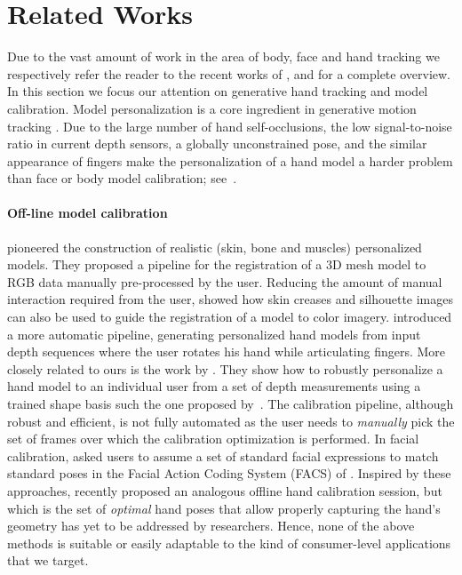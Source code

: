 \section{Related Works}
Due to the vast amount of work in the area of body, face and hand tracking we respectively refer the reader to the recent works of ,  and  for a complete overview. In this section we focus our attention on generative hand tracking and model calibration. Model personalization is a core ingredient in generative motion tracking \cite{pons2011model}.  Due to the large number of hand self-occlusions, the low signal-to-noise ratio in current depth sensors, a globally unconstrained pose, and the similar appearance of fingers make the personalization of a hand model a harder problem than face or body model calibration; see~\cite{supancic2015depth}.

\paragraph{Off-line model calibration}
 pioneered the construction of realistic (skin, bone and muscles) personalized models. They proposed a pipeline for the registration of a 3D mesh model to RGB data manually pre-processed by the user. Reducing the amount of manual interaction required from the user,  showed how skin creases and silhouette images can also be used to guide the registration of a model to color imagery.  introduced a more automatic pipeline, generating personalized hand models from input depth sequences where the user rotates his hand while articulating fingers. More closely related to ours is the work by . They show how to robustly personalize a hand model to an individual user from a set of depth measurements using a trained shape basis such the one proposed by~. The calibration pipeline, although robust and efficient, is not fully automated as the user needs to \emph{manually} pick the set of frames over which the calibration optimization is performed. 
In facial calibration,  asked users to assume a set of standard facial expressions to match standard poses in the Facial Action Coding System (FACS) of .
Inspired by these approaches,  recently proposed an analogous offline hand calibration session, but which is the set of \emph{optimal} hand poses that allow properly capturing the hand's geometry has yet to be addressed by researchers. Hence, none of the above methods is suitable or easily adaptable to the kind of consumer-level applications that we target.

